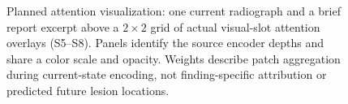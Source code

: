 \begin{figure}[!htbp]
    \centering
    \caption{Planned attention visualization: one current radiograph and a brief
    report excerpt above a $2\times2$ grid of actual visual-slot attention
    overlays (S5--S8). Panels identify the source encoder depths and share a
    color scale and opacity. Weights describe patch aggregation during
    current-state encoding, not finding-specific attribution or predicted
    future lesion locations.}
    \label{fig:candidate_slot_attention}
\end{figure}
